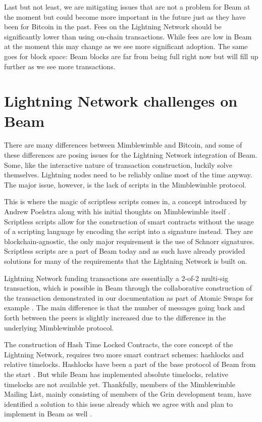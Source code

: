 \documentclass[letterpaper]{article}
\begin{document}
Last but not least, we are mitigating issues that are not a problem for Beam at the moment but could become more important in the future just as they have been for Bitcoin in the past. Fees on the Lightning Network should be significantly lower than using on-chain transactions. While fees are low in Beam at the moment this may change as we see more significant adoption. The same goes for block space: Beam blocks are far from being full right now but will fill up further as we see more transactions.

\section{Lightning Network challenges on Beam}
There are many differences between Mimblewimble and Bitcoin, and some of these differences are posing issues for the Lightning Network integration of Beam. Some, like the interactive nature of transaction construction, luckily solve themselves. Lightning nodes need to be reliably online most of the time anyway. The major issue, however, is the lack of scripts in the Mimblewimble protocol. 

This is where the magic of scriptless scripts comes in, a concept introduced by Andrew Poelstra along with his initial thoughts on Mimblewimble itself \cite{poelstra}. Scriptless scripts allow for the construction of smart contracts without the usage of a scripting language by encoding the script into a signature instead. They are blockchain-agnostic, the only major requirement is the use of Schnorr signatures. Scriptless scripts are a part of Beam today and as such have already provided solutions for many of the requirements that the Lightning Network is built on.

Lightning Network funding transactions are essentially a 2-of-2 multi-sig transaction, which is possible in Beam through the collaborative construction of the transaction demonstrated in our documentation as part of Atomic Swaps for example \cite{swap}. The main difference is that the number of messages going back and forth between the peers is slightly increased due to the difference in the underlying Mimblewimble protocol.

The construction of Hash Time Locked Contracts, the core concept of the Lightning Network, requires two more smart contract schemes: hashlocks and relative timelocks. Hashlocks have been a part of the base protocol of Beam from the start \cite{transaction}. But while Beam has implemented absolute timelocks, relative timelocks are not available yet. Thankfully, members of the Mimblewimble Mailing List, mainly consisting of members of the Grin development team, have identified a solution to this issue already which we agree with and plan to implement in Beam as well \cite{contracts}.
\end{document}
